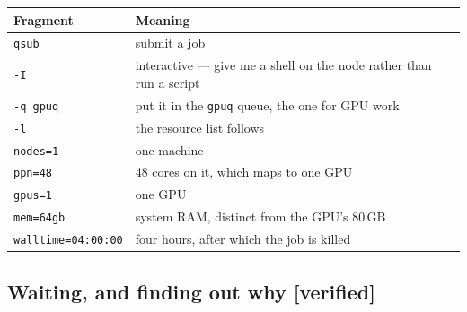 \documentclass[11pt,a4paper]{article}
\newcommand{\verified}{{\color{good}\textbf{[verified]}}}
\begin{document}
\begin{center}
\begin{tabularx}{\linewidth}{@{}l X@{}}
\toprule
\textbf{Fragment} & \textbf{Meaning} \\
\midrule
\texttt{qsub} & submit a job \\
\texttt{-I} & interactive --- give me a shell on the node rather than run a script \\
\texttt{-q gpuq} & put it in the \texttt{gpuq} queue, the one for GPU work \\
\texttt{-l} & the resource list follows \\
\texttt{nodes=1} & one machine \\
\texttt{ppn=48} & 48 cores on it, which maps to one GPU \\
\texttt{gpus=1} & one GPU \\
\texttt{mem=64gb} & system RAM, distinct from the GPU's 80\,GB \\
\texttt{walltime=04:00:00} & four hours, after which the job is killed \\
\bottomrule
\end{tabularx}
\end{center}

\subsection{Waiting, and finding out why \verified}
\end{document}
